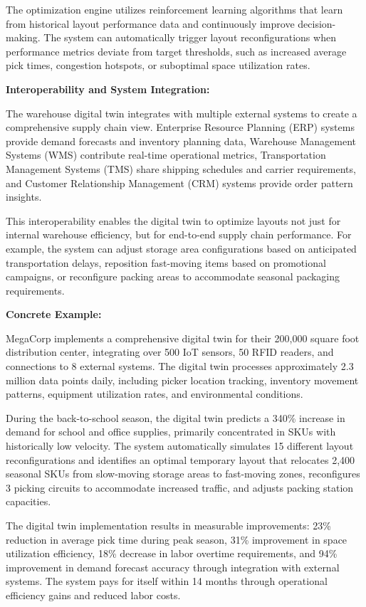 \documentclass{article}
\begin{document}
The optimization engine utilizes reinforcement learning algorithms that learn from historical layout performance data and continuously improve decision-making. The system can automatically trigger layout reconfigurations when performance metrics deviate from target thresholds, such as increased average pick times, congestion hotspots, or suboptimal space utilization rates.

\textbf{Interoperability and System Integration:}

The warehouse digital twin integrates with multiple external systems to create a comprehensive supply chain view. Enterprise Resource Planning (ERP) systems provide demand forecasts and inventory planning data, Warehouse Management Systems (WMS) contribute real-time operational metrics, Transportation Management Systems (TMS) share shipping schedules and carrier requirements, and Customer Relationship Management (CRM) systems provide order pattern insights.

This interoperability enables the digital twin to optimize layouts not just for internal warehouse efficiency, but for end-to-end supply chain performance. For example, the system can adjust storage area configurations based on anticipated transportation delays, reposition fast-moving items based on promotional campaigns, or reconfigure packing areas to accommodate seasonal packaging requirements.

\textbf{Concrete Example:}

MegaCorp implements a comprehensive digital twin for their 200,000 square foot distribution center, integrating over 500 IoT sensors, 50 RFID readers, and connections to 8 external systems. The digital twin processes approximately 2.3 million data points daily, including picker location tracking, inventory movement patterns, equipment utilization rates, and environmental conditions.

During the back-to-school season, the digital twin predicts a 340\% increase in demand for school and office supplies, primarily concentrated in SKUs with historically low velocity. The system automatically simulates 15 different layout reconfigurations and identifies an optimal temporary layout that relocates 2,400 seasonal SKUs from slow-moving storage areas to fast-moving zones, reconfigures 3 picking circuits to accommodate increased traffic, and adjusts packing station capacities.

The digital twin implementation results in measurable improvements: 23\% reduction in average pick time during peak season, 31\% improvement in space utilization efficiency, 18\% decrease in labor overtime requirements, and 94\% improvement in demand forecast accuracy through integration with external systems. The system pays for itself within 14 months through operational efficiency gains and reduced labor costs.
\end{document}
